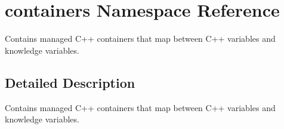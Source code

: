 \hypertarget{namespacecontainers}{}\section{containers Namespace Reference}
\label{namespacecontainers}


Contains managed C++ containers that map between C++ variables and knowledge variables.  




\subsection{Detailed Description}
Contains managed C++ containers that map between C++ variables and knowledge variables. 
